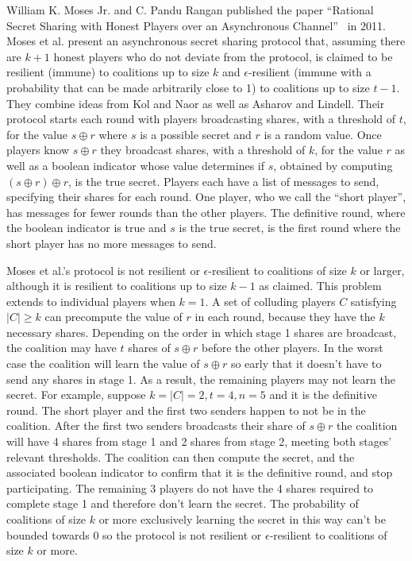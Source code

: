 \documentclass[12pt]{dalcsthesis}
\begin{document}
William K. Moses Jr. and C. Pandu Rangan published the paper ``Rational Secret Sharing with Honest Players over an Asynchronous Channel''~\cite{moses11} in 2011. Moses et al. present an asynchronous secret sharing protocol that, assuming there are $k+1$ honest players who do not deviate from the protocol, is claimed to be resilient (immune) to coalitions up to size $k$ and $\epsilon$-resilient (immune with a probability that can be made arbitrarily close to 1) to coalitions up to size $t-1$. They combine ideas from Kol and Naor as well as Asharov and Lindell. Their protocol starts each round with players broadcasting shares, with a threshold of $t$, for the value $s \oplus r$ where $s$ is a possible secret and $r$ is a random value. Once players know $s \oplus r$ they broadcast shares, with a threshold of $k$, for the value $r$ as well as a boolean indicator whose value determines if $s$, obtained by computing $(s \oplus r) \oplus r$, is the true secret. Players each have a list of messages to send, specifying their shares for each round. One player, who we call the ``short player'', has messages for fewer rounds than the other players. The definitive round, where the boolean indicator is true and $s$ is the true secret, is the first round where the short player has no more messages to send.

Moses et al.'s protocol is not resilient or $\epsilon$-resilient to coalitions of size $k$ or larger, although it is resilient to coalitions up to size $k-1$ as claimed. This problem extends to individual players when $k=1$. A set of colluding players $C$ satisfying $|C| \geq k$ can precompute the value of $r$ in each round, because they have the $k$ necessary shares. Depending on the order in which stage 1 shares are broadcast, the coalition may have $t$ shares of $s \oplus r$ before the other players. In the worst case the coalition will learn the value of $s \oplus r$ so early that it doesn't have to send any shares in stage 1. As a result, the remaining players may not learn the secret. For example, suppose $k=|C|=2, t=4, n=5$ and it is the definitive round. The short player and the first two senders happen to not be in the coalition. After the first two senders broadcasts their share of $s \oplus r$ the coalition will have 4 shares from stage 1 and 2 shares from stage 2, meeting both stages' relevant thresholds. The coalition can then compute the secret, and the associated boolean indicator to confirm that it is the definitive round, and stop participating. The remaining 3 players do not have the 4 shares required to complete stage 1 and therefore don't learn the secret. The probability of coalitions of size $k$ or more exclusively learning the secret in this way can't be bounded towards 0 so the protocol is not resilient or $\epsilon$-resilient to coalitions of size $k$ or more.
\end{document}
